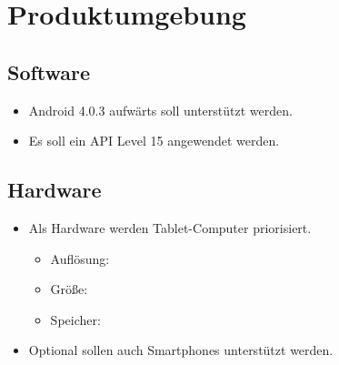 \section{Produktumgebung}

\subsection{Software}
\begin{itemize}
	\item Android 4.0.3 aufwärts soll unterstützt werden.
	\item Es soll ein API Level 15 angewendet werden.
\end{itemize}
\subsection{Hardware}
\begin{itemize}
	\item Als Hardware werden Tablet-Computer priorisiert.
	\begin{itemize}
		\item Auflösung:
		\item Größe:
		\item Speicher:
	\end{itemize}
	\item Optional sollen auch Smartphones unterstützt werden.
\end{itemize}
